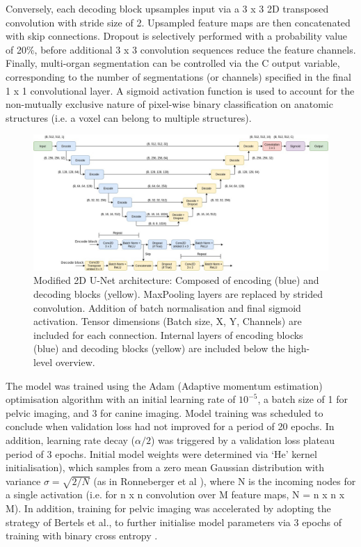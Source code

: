 Conversely, each decoding block upsamples input via a 3 x 3 2D transposed
convolution with stride size of 2. Upsampled feature maps are then concatenated
with skip connections. Dropout is selectively performed with a probability value
of 20\%, before additional 3 x 3 convolution sequences reduce the feature
channels. Finally, multi-organ segmentation can be controlled via the C output
variable, corresponding to the number of segmentations (or channels) specified
in the final 1 x 1 convolutional layer. A sigmoid activation function is used to
account for the non-mutually exclusive nature of pixel-wise binary
classification on anatomic structures (i.e. a voxel can belong to multiple
structures).

\begin{figure}[h]
	\begin{center}
		\hspace*{-1.3cm}\includegraphics[width=1.15\textwidth]{figures/model_diagram}
		\caption{Modified 2D U-Net architecture: Composed of encoding (blue) and
      decoding blocks (yellow). MaxPooling layers are replaced by strided
      convolution. Addition of batch normalisation and final sigmoid activation.
      Tensor dimensions (Batch size, X, Y, Channels) are included for each
      connection. Internal layers of encoding blocks (blue) and decoding blocks
      (yellow) are included below the high-level overview.}
		\label{fig:model}
	\end{center}
\end{figure}

The model was trained using the Adam (Adaptive momentum estimation) optimisation
algorithm \cite{kingma2014} with an initial learning rate of $10^{-5}$, a batch
size of 1 for pelvic imaging, and 3 for canine imaging. Model training was
scheduled to conclude when validation loss had not improved for a period of 20
epochs. In addition, learning rate decay ($\alpha /2$) was triggered by a validation loss
plateau period of 3 epochs. Initial model weights were determined via `He'
kernel initialisation), which samples from a zero mean Gaussian distribution
with variance $\sigma=\sqrt{2/N}$ (as in Ronneberger et al
\cite{Ronneberger_2015}), where N is the incoming nodes for a single activation
(i.e. for n x n convolution over M feature maps, N = n x n x M). In addition,
training for pelvic imaging was accelerated by adopting the strategy of Bertels
et al., to further initialise model parameters via 3 epochs of training with
binary cross entropy \cite{Bertels2019}.

